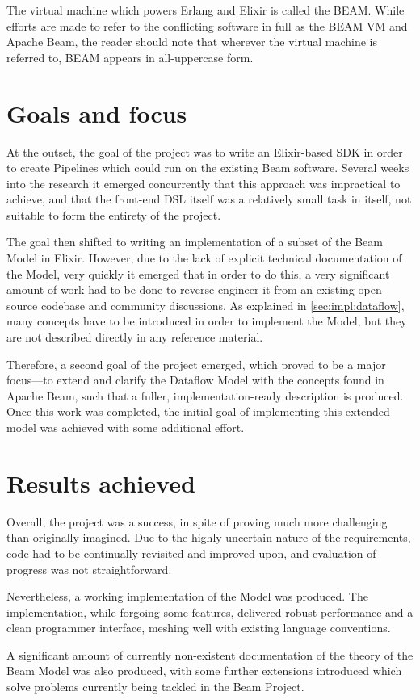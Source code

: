 The virtual machine which powers Erlang and Elixir is called the BEAM.
While efforts are made to refer to the conflicting software in full as the BEAM VM and Apache Beam, the reader should note that wherever the virtual machine is referred to, BEAM appears in all-uppercase form.

\section{Goals and focus}\label{sec:intro:goals}

At the outset, the goal of the project was to write an Elixir-based SDK in order to create Pipelines which could run on the existing Beam software.
Several weeks into the research it emerged concurrently that this approach was impractical to achieve, and that the front-end DSL itself was a relatively small task in itself, not suitable to form the entirety of the project.

The goal then shifted to writing an implementation of a subset of the Beam Model in Elixir.
However, due to the lack of explicit technical documentation of the Model, very quickly it emerged that in order to do this, a very significant amount of work had to be done to reverse-engineer it from an existing open-source codebase and community discussions.
As explained in \cref{sec:impl:dataflow}, many concepts have to be introduced in order to implement the Model, but they are not described directly in any reference material.

Therefore, a second goal of the project emerged, which proved to be a major focus---to extend and clarify the Dataflow Model with the concepts found in Apache Beam, such that a fuller, implementation-ready description is produced.
Once this work was completed, the initial goal of implementing this extended model was achieved with some additional effort.

\section{Results achieved}

Overall, the project was a success, in spite of proving much more challenging than originally imagined.
Due to the highly uncertain nature of the requirements, code had to be continually revisited and improved upon, and evaluation of progress was not straightforward.

Nevertheless, a working implementation of the Model was produced.
The implementation, while forgoing some features, delivered robust performance and a clean programmer interface, meshing well with existing language conventions.

A significant amount of currently non-existent documentation of the theory of the Beam Model was also produced, with some further extensions introduced which solve problems currently being tackled in the Beam Project.

